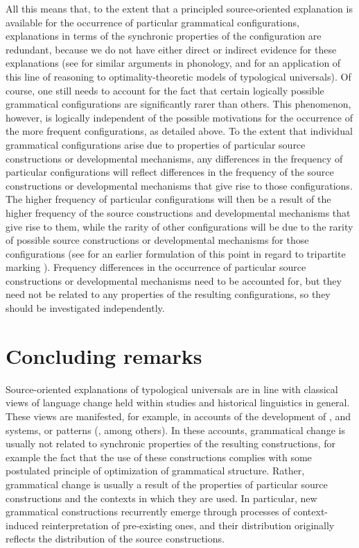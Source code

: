 \documentclass[output=paper]{langsci/langscibook}
\begin{document}
\newpage
All this means that, to the extent that a principled source-oriented
explanation is available for the occurrence of particular grammatical
configurations, explanations in terms of the synchronic properties of
the configuration are redundant, because we do not have either direct
or indirect evidence for these explanations (see \citealt{Blevins2004} for
similar arguments in phonology, and \citealt{Newmeyer2002,Newmeyer2004} for an application of
this line of reasoning to optimality-theoretic models of typological
universals). Of course, one still needs to account for the fact that
certain logically possible grammatical configurations
are significantly rarer than others. This phenomenon, however, is logically
independent of the possible motivations for the occurrence of the more
frequent configurations, as
detailed above. To the extent that
individual grammatical configurations arise due to properties of
particular source constructions or developmental mechanisms, any differences in the frequency of particular
configurations will reflect differences in the frequency of
the source constructions or developmental mechanisms that give
rise to those configurations. The higher
frequency of particular configurations will then  be a result of the higher frequency of the  source
constructions and developmental mechanisms that give rise to them,
while the rarity of other configurations
will be due to the rarity of possible
source constructions or developmental mechanisms for those
configurations (see \citealt{Harris2008} for an earlier formulation of this point
in regard to tripartite  marking ). Frequency differences in the occurrence of particular source
constructions or developmental mechanisms need to be
accounted for, but they need not be related to any properties of the
resulting configurations, so they should be investigated independently.

\section{Concluding remarks}
Source-oriented explanations of typological universals are  in line with classical
views of language change held within
 studies and historical linguistics in
general. These views are manifested, for example, in accounts of the
development of ,  and  systems, or 
patterns (\citealt{BybeeEtAl1994,HarrisCampbell1995,Gildea1998,TraugottDasher2002}, among others). In these accounts, grammatical change
is usually not related to synchronic properties of the resulting
constructions, for example the fact that the use of these
constructions complies with some postulated principle of optimization
of grammatical structure. Rather, grammatical change is usually a result of the properties of particular
source constructions and the contexts in which they are used. In
particular, new grammatical constructions recurrently emerge through
processes of context-induced reinterpretation of pre-existing
ones, and their distribution originally reflects the distribution of the
source constructions. 
\end{document}
